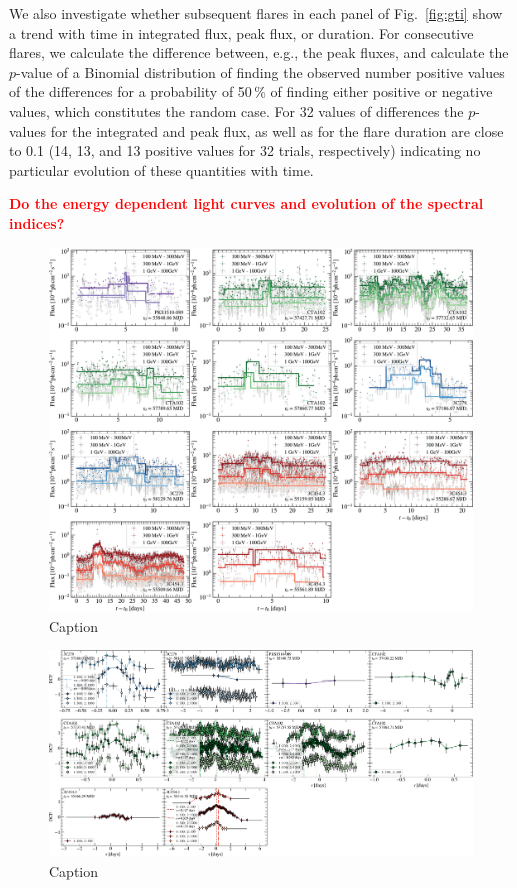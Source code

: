 \documentclass[twocolumn]{aastex62}
\newcommand{\todo}[1]{\textbf{\textcolor{red}{#1}}}
\begin{document}
We also investigate whether subsequent flares in each panel of Fig.~\ref{fig:gti} show a trend with time in integrated flux, peak flux, or duration. 
For consecutive flares, we calculate the difference between, e.g., the peak fluxes, and calculate the $p$-value of a Binomial distribution of finding the observed number positive values of the differences for a probability of 50\,\% of finding either positive or negative values, which constitutes the random case.
For 32 values of differences the $p$-values for the integrated and peak flux, as well as for the flare duration are close to 0.1 (14, 13, and 13 positive values for 32 trials, respectively) indicating no particular evolution of these quantities with time. 


\todo{Do the energy dependent light curves and evolution of the spectral indices?}

\begin{figure}
    \centering
    \includegraphics[width = .9 \linewidth]{figures/lc_ebins.pdf}
    \caption{Caption}
    \label{fig:lcebins}
\end{figure}

\begin{figure}
    \centering
    \includegraphics[width = .9 \linewidth]{figures/zdcf_ebins.pdf}
    \caption{Caption}
    \label{fig:zdcf}
\end{figure}
\end{document}
